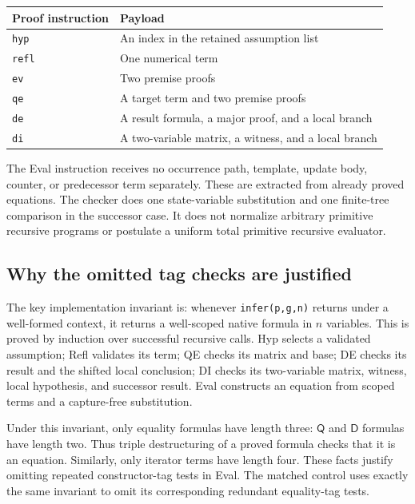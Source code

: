 \documentclass[11pt]{article}
\theoremstyle{definition}
\newcommand{\Q}{\mathsf Q}
\newcommand{\D}{\mathsf D}
\begin{document}
\begin{center}
\begin{tabular}{@{}ll@{}}
\toprule
Proof instruction & Payload\\
\midrule
\texttt{hyp} & An index in the retained assumption list\\
\texttt{refl} & One numerical term\\
\texttt{ev} & Two premise proofs\\
\texttt{qe} & A target term and two premise proofs\\
\texttt{de} & A result formula, a major proof, and a local branch\\
\texttt{di} & A two-variable matrix, a witness, and a local branch\\
\bottomrule
\end{tabular}
\end{center}

The Eval instruction receives no occurrence path, template, update body,
counter, or predecessor term separately. These are extracted from already
proved equations. The checker does one state-variable substitution and
one finite-tree comparison in the successor case. It does not normalize
arbitrary primitive recursive programs or postulate a uniform total
primitive recursive evaluator.

\subsection{Why the omitted tag checks are justified}

The key implementation invariant is: whenever
\texttt{infer(p,g,n)} returns under a well-formed context, it returns a
well-scoped native formula in $n$ variables. This is proved by induction
over successful recursive calls. Hyp selects a validated assumption;
Refl validates its term; QE checks its matrix and base; DE checks its
result and the shifted local conclusion; DI checks its two-variable
matrix, witness, local hypothesis, and successor result. Eval constructs
an equation from scoped terms and a capture-free substitution.

Under this invariant, only equality formulas have length three: $\Q$
and $\D$ formulas have length two. Thus triple destructuring of a proved
formula checks that it is an equation. Similarly, only iterator terms
have length four. These facts justify omitting repeated constructor-tag
tests in Eval. The matched control uses exactly the same invariant to
omit its corresponding redundant equality-tag tests.
\end{document}
